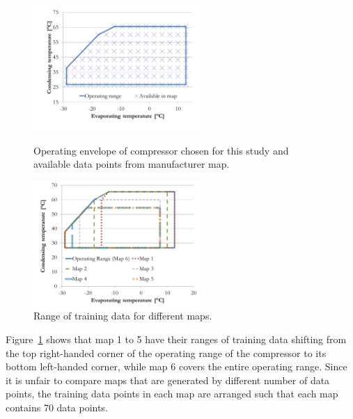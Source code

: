 \begin{figure}[h]
\begin{minipage}{15pc}
\includegraphics[width=15pc]{./fig/operating_envelope.pdf}
\caption{\label{fig:oper_envelope}Operating envelope of compressor chosen for this study and available data points from manufacturer map.}
\end{minipage}\hspace{2pc}%
\begin{minipage}{15pc}
\includegraphics[width=15pc]{./fig/training_data_sets.pdf}
\caption{\label{fig:training_envelope} Range of training data for different maps.}
\end{minipage} 
\end{figure}

Figure~\ref{fig:training_envelope} shows that map 1 to 5 have their ranges of training data shifting from the top right-handed corner of the operating range of the compressor to its bottom left-handed corner, while map 6 covers the entire operating range. Since it is unfair to compare maps that are generated by different number of data points, the training data points in each map are arranged such that each map contains 70 data points.